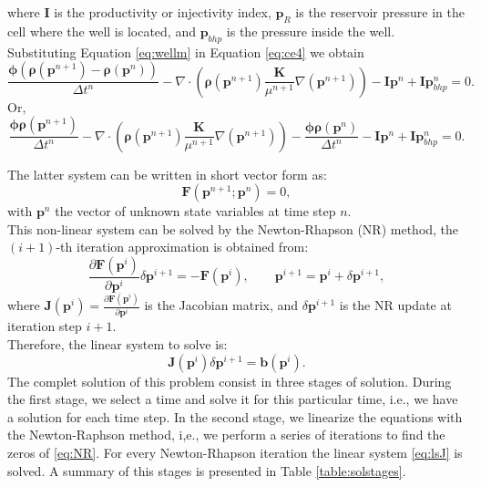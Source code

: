 \documentclass[12pt]{article}
\numberwithin{equation}{section}
\begin{document}
where $\mathbf{I}$ is the productivity or injectivity index, $\mathbf{p}_{R}$ is the reservoir pressure in the cell 
where the well is located, 
and $\mathbf{p}_{bhp}$ is the pressure inside the well. \\
Substituting Equation \ref{eq:wellm} in Equation \ref{eq:ce4} we obtain 
\begin{equation}\label{eq:ce5}
 \frac{\mathbf{\phi}(\mathbf{\rho}(\mathbf{p}^{n+1})
 -\mathbf{\rho}(\mathbf{p}^{n}))}{\Delta t^n}
 -\nabla \cdot (\mathbf{\rho}(\mathbf{p}^{n+1}) 
 \frac{\mathbf{K}}{\mu^{n+1}}\nabla(\mathbf{p}^{n+1}))-\mathbf{I}\mathbf{p}^{n}+\mathbf{I}\mathbf{p}_{bhp}^{n}=0.
\end{equation}
Or,
\begin{equation}\label{eq:ce6}
 \frac{\mathbf{\phi}\mathbf{\rho}(\mathbf{p}^{n+1}
 )}{\Delta t^n}-\nabla \cdot (\mathbf{\rho}(\mathbf{p}^{n+1}) 
 \frac{\mathbf{K}}{\mu^{n+1}}\nabla(\mathbf{p}^{n+1}))
 -\frac{\mathbf{\phi}\mathbf{\rho}(\mathbf{p}^{n})}{\Delta t^n}
 -\mathbf{I}\mathbf{p}^{n}+\mathbf{I}\mathbf{p}_{bhp}^{n}=0.
\end{equation}

The latter system can be written in short vector form as:
\begin{equation}\label{eq:NR}
 \mathbf{F}(\mathbf{p}^{n+1};\mathbf{p}^n)=0,
\end{equation}
with $\mathbf{p}^n$ the vector of unknown state variables at time step $n$.\\
This non-linear system can be solved by the Newton-Rhapson (NR) method, the $(i+1)$-th iteration approximation is 
obtained from:
$$\frac{\partial \mathbf{F}(\mathbf{p}^i)}{\partial \mathbf{p}^i}\delta\mathbf{p}^{i+1}=-\mathbf{F}(\mathbf{p}^i),
\qquad \mathbf{p}^{i+1}=\mathbf{p}^i+\delta \mathbf{p}^{i+1},$$
where $\mathbf{J}(\mathbf{p}^i)=\frac{\partial \mathbf{F}(\mathbf{p}^i)}{\partial \mathbf{p}^i}$ is the 
Jacobian matrix, and $\delta \mathbf{p}^{i+1}$ is the NR update at iteration step $i+1$.\\
Therefore, the linear system to solve is:\\
\begin{equation}\label{eq:lsJ}
\mathbf{J}(\mathbf{p}^i)\delta \mathbf{p}^{i+1}=\mathbf{b}(\mathbf{p}^i).
\end{equation}
The complet solution of this problem consist in three stages of solution. During the first stage,  we select a 
time and solve it for this particular time, i.e., we have a solution for each time step. In the second stage, 
we linearize the equations with the Newton-Raphson method, i,e., we perform a series of iterations to find the 
zeros of \eqref{eq:NR}. For every Newton-Rhapson iteration the linear system \eqref{eq:lsJ} is solved. A summary of 
this stages is presented in Table \ref{table:solstages}.
\end{document}
